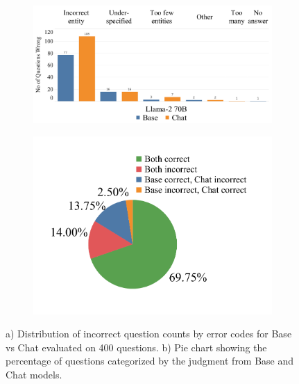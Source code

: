 
\onecolumn
\begin{figure}[t]
\centering
\begin{subfigure}{0.6\textwidth}
    \includegraphics[width=\textwidth]{figures/ErrorCode.pdf}
    \caption{}
     \label{fig:comparisonBarplot}
\end{subfigure}
%
\hfill
%
\begin{subfigure}{0.39\textwidth}
\includegraphics[width=\textwidth]{figures/PieChart.pdf}
\caption{}
\label{fig:BaseChatPieChart}
\end{subfigure}
\caption{a) Distribution of incorrect question counts by error codes for  Base vs Chat \evaluatormodels evaluated on 400 questions. b) Pie chart showing the percentage of questions categorized by the judgment from Base and Chat models.}
\end{figure}
